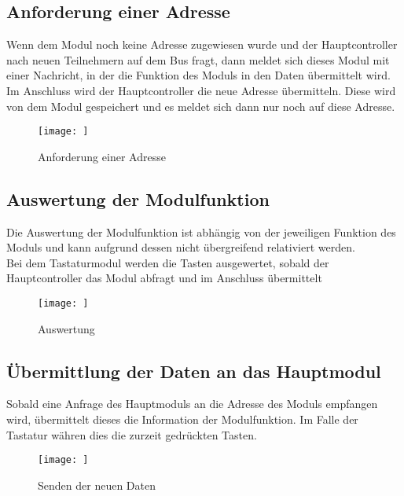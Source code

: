 \subsection{Anforderung einer Adresse}
\textmd{Wenn dem Modul noch keine Adresse zugewiesen wurde und der Hauptcontroller nach neuen Teilnehmern auf dem Bus fragt, dann meldet sich dieses Modul mit einer Nachricht, in der die Funktion des Moduls in den Daten übermittelt wird.\\
Im Anschluss wird der Hauptcontroller die neue Adresse übermitteln. Diese wird von dem Modul gespeichert und es meldet sich dann nur noch auf diese Adresse.
}
\begin{figure}[H]
    \centering    
    \texttt{[image: ]}
    \caption{Anforderung einer Adresse}
    \label{getAdress()}
\end{figure}

\subsection{Auswertung der Modulfunktion}
\textmd{Die Auswertung der Modulfunktion ist abhängig von der jeweiligen Funktion des Moduls und kann aufgrund dessen nicht übergreifend relativiert werden.\\
Bei dem Tastaturmodul werden die Tasten ausgewertet, sobald der Hauptcontroller das Modul abfragt und im Anschluss übermittelt
}
\begin{figure}[H]
    \centering    
    \texttt{[image: ]}
    \caption{Auswertung}
    \label{auswertung()}
\end{figure}

\subsection{Übermittlung der Daten an das Hauptmodul}
\textmd{Sobald eine Anfrage des Hauptmoduls an die Adresse des Moduls empfangen wird, übermittelt dieses die Information der Modulfunktion. Im Falle der Tastatur währen dies die zurzeit gedrückten Tasten.}
\begin{figure}[H]
    \centering    
    \texttt{[image: ]}
    \caption{Senden der neuen Daten}
    \label{sendData()}
\end{figure}

